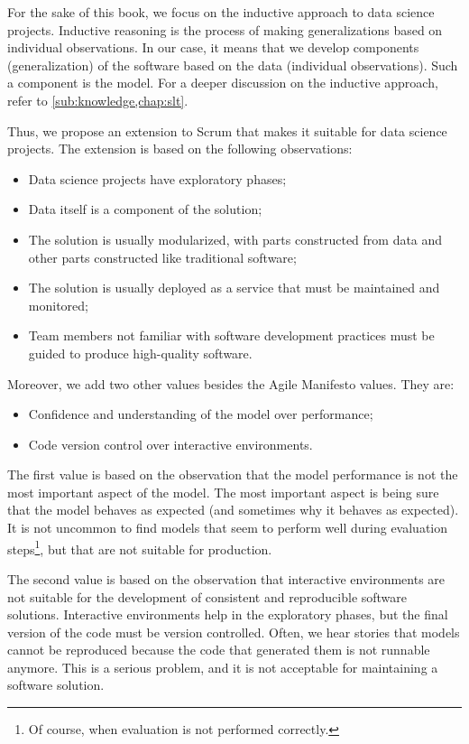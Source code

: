 For the sake of this book, we focus on the inductive approach to data science projects.
Inductive reasoning is the process of making generalizations based on individual
observations.  In our case, it means that we develop components (generalization) of the
software based on the data (individual observations).  Such a component is the
\gls{model}. For a deeper discussion on the inductive approach, refer to
\cref{sub:knowledge,chap:slt}.

Thus, we propose an extension to Scrum that makes it suitable for data science projects.
The extension is based on the following observations:
\begin{itemize}
  \itemsep0em
  \item Data science projects have exploratory phases;
  \item Data itself is a component of the solution;
  \item The solution is usually modularized, with parts constructed from data and other parts
    constructed like traditional software;
  \item The solution is usually deployed as a service that must be maintained and
    monitored;
  \item Team members not familiar with software development practices must be guided to
    produce high-quality software.
\end{itemize}

Moreover, we add two other values besides the Agile Manifesto values.  They are:
\begin{itemize}
  \itemsep0em
  \item Confidence and understanding of the model over performance;
  \item Code version control over interactive environments.
\end{itemize}

The first value is based on the observation that the model performance is not the most
important aspect of the model.  The most important aspect is being sure that the model
behaves as expected (and sometimes why it behaves as expected).  It is not uncommon to find
models that seem to perform well during evaluation steps\footnote{Of course, when
evaluation is not performed correctly.}, but that are not suitable for production.

The second value is based on the observation that interactive environments are not suitable
for the development of consistent and reproducible software solutions.  Interactive environments
help in the exploratory phases, but the final version of the code must be version
controlled.  Often, we hear stories that models cannot be reproduced because the code that
generated them is not runnable anymore.  This is a serious problem, and it is not
acceptable for maintaining a software solution.

